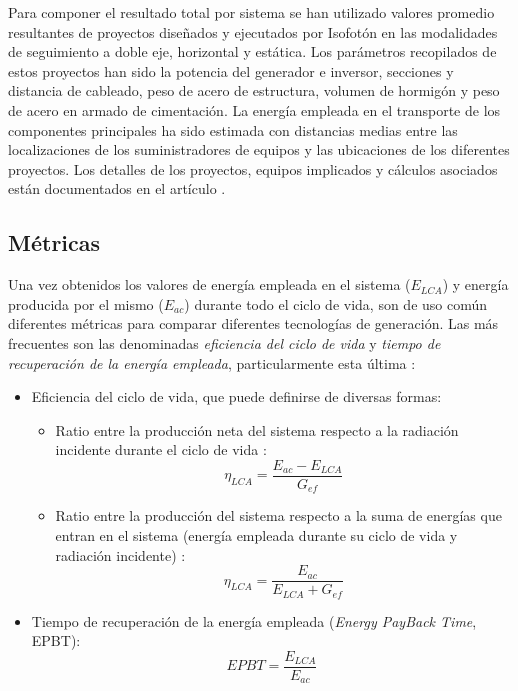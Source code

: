 Para componer el resultado total por sistema se han utilizado valores
promedio resultantes de proyectos diseñados y ejecutados por Isofotón
en las modalidades de seguimiento a doble eje, horizontal y estática.
Los parámetros recopilados de estos proyectos han sido la potencia del
generador e inversor, secciones y distancia de cableado, peso de acero
de estructura, volumen de hormigón y peso de acero en armado de
cimentación. La energía empleada en el transporte de los componentes
principales ha sido estimada con distancias medias entre las
localizaciones de los suministradores de equipos y las ubicaciones de
los diferentes proyectos. Los detalles de los proyectos, equipos
implicados y cálculos asociados están documentados en el artículo
\cite{Perpinan.Lorenzo.ea2009}.

\subsection{Métricas}

Una vez obtenidos los valores de energía empleada en el sistema
($E_{LCA}$) y energía producida por el mismo ($E_{ac}$) durante todo
el ciclo de vida, son de uso común diferentes métricas para comparar
diferentes tecnologías de generación. Las más frecuentes son las
denominadas \emph{eficiencia del ciclo de vida} y \emph{tiempo de
  recuperación de la energía empleada}, particularmente esta última
\cite{Meier2002, Keoleian.Lewis1997}:

\begin{itemize}
\item Eficiencia del ciclo de vida, que puede definirse de diversas
  formas:

  \begin{itemize}
  \item Ratio entre la producción neta del sistema respecto a la
    radiación incidente durante el ciclo de vida \cite{Keoleian.Lewis1997}:
    \begin{equation}
      \eta_{LCA}=\frac{E_{ac}-E_{LCA}}{G_{ef}}
      \label{eq:EfLCA}
    \end{equation}

  \item Ratio entre la producción del sistema respecto a la suma de
    energías que entran en el sistema (energía empleada durante su
    ciclo de vida y radiación incidente) \cite{Meier2002}:
    \begin{equation}
      \eta_{LCA}=\frac{E_{ac}}{E_{LCA}+G_{ef}}
      \label{eq:EfLCA2}
    \end{equation}

  \end{itemize}
\item Tiempo de recuperación de la energía empleada (\emph{Energy
    PayBack Time}, EPBT):
  \begin{equation}
    EPBT=\frac{E_{LCA}}{E_{ac}}
    \label{eq:EPBT}
  \end{equation}

\end{itemize}

